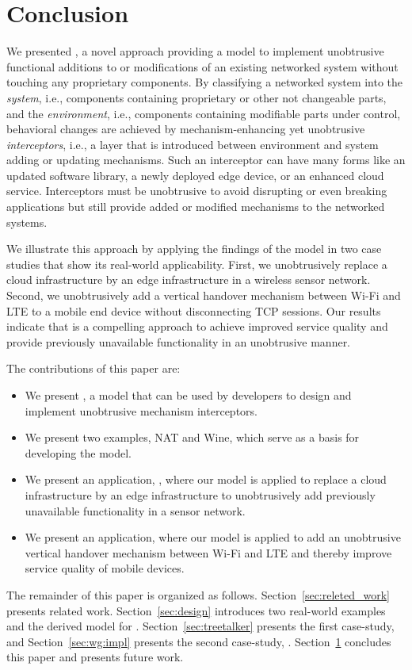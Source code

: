 \section{Conclusion}
\label{sec:conclusion}

We presented \emph{\mm}, a novel approach providing a model to implement unobtrusive functional additions to or modifications of an existing networked system without touching any proprietary components.
By classifying a networked system into the \emph{system}, i.e., components containing proprietary or other not changeable parts, and the \emph{environment}, i.e., components containing modifiable parts under control, 
behavioral changes are achieved by mechanism-enhancing yet unobtrusive \emph{interceptors},
i.e., a layer that is introduced between environment and system adding or updating mechanisms.
Such an interceptor can have many forms like an updated software library, a newly deployed edge device, or an enhanced cloud service.
Interceptors must be unobtrusive to avoid disrupting or even breaking applications but still provide added or modified mechanisms to the networked systems.

We illustrate this approach by applying the findings of the model in two case studies
that show its real-world applicability.
First, we unobtrusively replace a cloud infrastructure by an edge infrastructure in a wireless sensor network.
Second, we unobtrusively add a vertical handover mechanism between Wi-Fi and LTE to a mobile end device without disconnecting TCP sessions.
Our results indicate that \mm is a compelling approach to achieve improved service quality and provide previously unavailable functionality in an unobtrusive manner.

The contributions of this paper are:
\begin{itemize}
    \item We present \mm, a model that can be used by developers to design and implement unobtrusive mechanism interceptors.
    \item We present two examples, NAT and Wine, which serve as a basis for developing the \mm model.
    \item We present an application, \ttt, where our model is applied to replace a cloud infrastructure by an edge infrastructure to unobtrusively add previously unavailable functionality in a sensor network.
    \item We present an application, where our model is applied to add an unobtrusive vertical handover mechanism between Wi-Fi and LTE and thereby improve service quality of mobile devices.
\end{itemize}

The remainder of this paper is organized as follows.
Section~\ref{sec:releted_work} presents related work.
Section~\ref{sec:design} introduces two real-world examples and the derived model for \mm.
Section~\ref{sec:treetalker} presents the first case-study, \ttt and Section~\ref{sec:wg:impl} presents the second case-study, \wgh.
Section~\ref{sec:conclusion} concludes this paper and presents future work.
